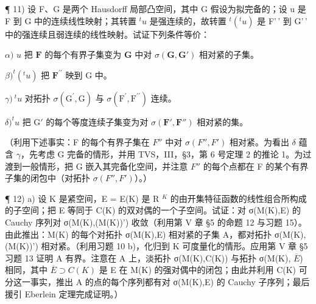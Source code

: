 ¶ 11) 设 F、G 是两个 Hausdorff 局部凸空间，其中 G 假设为拟完备的；设 u 是 F 到 G 中的连续线性映射；其转置 \(^{t}u\) 是强连续的，故转置 \(^{t}(^{t}u)\) 是 F'\,' 到 G'\,' 中的强连续且弱连续的线性映射。试证下列条件等价：

\(\alpha)\) \(u\) 把 \(\mathbf{F}\) 的每个有界子集变为 \(\mathbf{G}\) 中对 \(\sigma(\mathbf{G},\mathbf{G}')\) 相对紧的子集。

\(\beta)^{t}(^{t}u)\) 把 \(\mathbf{F}^{\prime \prime}\) 映到 G 中。

\(\gamma)\ ^{t}u\) 对拓扑 \(\sigma(\mathrm{G}^{\prime},\mathrm{G})\) 与 \(\sigma(\mathrm{F}^{\prime},\mathrm{F}^{\prime\prime})\) 连续。

\(\delta)^{t}u\) 把 \(\mathrm{G}'\) 的每个等度连续子集变为对 \(\sigma (\mathbf{F}',\mathbf{F}'')\) 相对紧的集。

（利用下述事实：F 的每个有界子集在 \(F''\) 中对 \(\sigma(F'', F')\) 相对紧。为看出 \(\delta\) 蕴含 \(\gamma\)，先考虑 G 完备的情形，并用 TVS，III，§3，第 6 号定理 2 的推论 1。为过渡到一般情形，把 G 嵌入其完备化空间，并注意 \(F''\) 的每个点都在 F 的某个有界子集的闭包中（对拓扑 \(\sigma(F'', F')\)）。）

¶ 12) a) 设 K 是紧空间，E = E(K) 是 R \(^{K}\) 的由开集特征函数的线性组合所构成的子空间；把 E 等同于 C(K) 的双对偶的一个子空间。试证：对 σ(M(K),E) 的 Cauchy 序列对 σ(M(K),(M(K))') 收敛（利用第 V 章 §5 的命题 12 与习题 15）。由此推出：M(K) 的每个对拓扑 σ(M(K),E) 相对紧的子集 A，都对拓扑 σ(M(K),(M(K))') 相对紧。（利用习题 10 b)，化归到 K 可度量化的情形。应用第 V 章 §5 习题 13 证明 A 有界。注意在 A 上，淡拓扑 σ(M(K),C(K)) 与拓扑 σ(M(K), \(\overline{E}\)) 相同，其中 \(\overline{E} \supset C(K)\) 是 E 在 M(K) 的强对偶中的闭包；由此并利用 C(K) 可分这一事实，推出 A 的点的每个序列都有对 σ(M(K),E) 的 Cauchy 子序列；最后援引 Eberlein 定理完成证明。）

